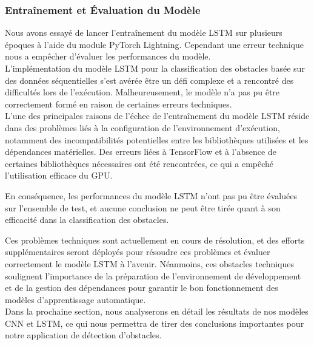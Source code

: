 \subsubsection{Entraînement et Évaluation du Modèle}
Nous avons essayé de lancer l'entraînement du modèle LSTM sur plusieurs époques à l'aide du module PyTorch Lightning. Cependant une erreur technique nous a empêcher d'évaluer les performances du modèle.\\

L'implémentation du modèle LSTM pour la classification des obstacles basée sur des données séquentielles s'est avérée être un défi complexe et a rencontré des difficultés lors de l'exécution. Malheureusement, le modèle n'a pas pu être correctement formé en raison de certaines erreurs techniques.\\

L'une des principales raisons de l'échec de l'entraînement du modèle LSTM réside dans des problèmes liés à la configuration de l'environnement d'exécution, notamment des incompatibilités potentielles entre les bibliothèques utilisées et les dépendances matérielles. Des erreurs liées à TensorFlow et à l'absence de certaines bibliothèques nécessaires ont été rencontrées, ce qui a empêché l'utilisation efficace du GPU.

En conséquence, les performances du modèle LSTM n'ont pas pu être évaluées sur l'ensemble de test, et aucune conclusion ne peut être tirée quant à son efficacité dans la classification des obstacles.

Ces problèmes techniques sont actuellement en cours de résolution, et des efforts supplémentaires seront déployés pour résoudre ces problèmes et évaluer correctement le modèle LSTM à l'avenir. Néanmoins, ces obstacles techniques soulignent l'importance de la préparation de l'environnement de développement et de la gestion des dépendances pour garantir le bon fonctionnement des modèles d'apprentissage automatique.\\

Dans la prochaine section, nous analyserons en détail les résultats de nos modèles CNN et LSTM, ce qui nous permettra de tirer des conclusions importantes pour notre application de détection d'obstacles.
